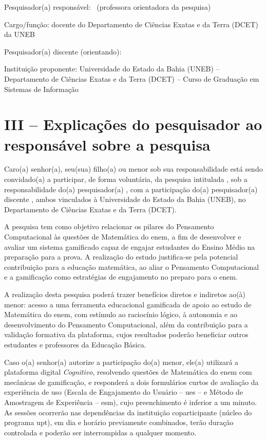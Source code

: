 \noindent Pesquisador(a) responsável: \imprimirorientador\ (professora orientadora da pesquisa)

\noindent Cargo/função: docente do Departamento de Ciências Exatas e da Terra (DCET) da UNEB

\noindent Pesquisador(a) discente (orientando): \imprimirautor

\noindent Instituição proponente: Universidade do Estado da Bahia (UNEB) -- Departamento de Ciências Exatas e da Terra (DCET) -- Curso de Graduação em Sistemas de Informação

\section{III -- Explicações do pesquisador ao responsável sobre a pesquisa}

Caro(a) senhor(a), seu(sua) filho(a) ou menor sob sua responsabilidade está sendo convidado(a) a participar, de forma voluntária, da pesquisa intitulada \imprimirtitulo, sob a responsabilidade do(a) pesquisador(a) \imprimirorientador, com a participação do(a) pesquisador(a) discente \imprimirautor, ambos vinculados à Universidade do Estado da Bahia (UNEB), no Departamento de Ciências Exatas e da Terra (DCET).

A pesquisa tem como objetivo relacionar os pilares do Pensamento Computacional às questões de Matemática do \gls{enem}, a fim de desenvolver e avaliar um sistema gamificado capaz de engajar estudantes do Ensino Médio na preparação para a prova. A realização do estudo justifica-se pela potencial contribuição para a educação matemática, ao aliar o Pensamento Computacional e a gamificação como estratégias de engajamento no preparo para o \gls{enem}.

A realização desta pesquisa poderá trazer benefícios diretos e indiretos ao(à) menor: acesso a uma ferramenta educacional gamificada de apoio ao estudo de Matemática do \gls{enem}, com estímulo ao raciocínio lógico, à autonomia e ao desenvolvimento do Pensamento Computacional, além da contribuição para a validação formativa da plataforma, cujos resultados poderão beneficiar outros estudantes e professores da Educação Básica.

Caso o(a) senhor(a) autorize a participação do(a) menor, ele(a) utilizará a plataforma digital \textit{Cognitivo}, resolvendo questões de Matemática do \gls{enem} com mecânicas de gamificação, e responderá a dois formulários curtos de avaliação da experiência de uso (Escala de Engajamento do Usuário -- \gls{ues} -- e Método de Amostragem de Experiência -- \gls{esm}), cujo preenchimento é inferior a um minuto. As sessões ocorrerão nas dependências da instituição coparticipante (núcleo do programa \gls{upt}), em dia e horário previamente combinados, terão duração controlada e poderão ser interrompidas a qualquer momento.

